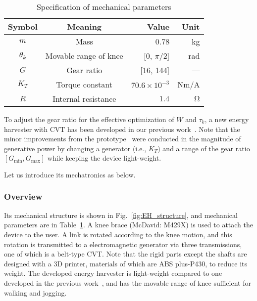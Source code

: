 \documentclass[twocolumn]{svjour3}          %
\begin{document}
\begin{table}[tb]
    \centering
    \small
    \caption{Specification of mechanical parameters}
    \begin{tabular}{ c c r r }
        \hline
        Symbol& Meaning & Value &  Unit
        \\ \hline
        $m$ & Mass & 0.78 & kg
        \\
        $\theta_k$ & Movable range of knee & [0, $\pi/2$] & rad
        \\
        $G$ & Gear ratio & [16, 144] & ---
        \\
        $K_T$ & Torque constant & $70.6 \times 10^{-3}$ & Nm/A
        \\
        $R$ & Internal resistance & $1.4$ & $\mathrm{\Omega}$
        \\ \hline
    \end{tabular}
    \label{tab:params_mech}
\end{table}

To adjust the gear ratio for the effective optimization of $W$ and $\tau_k$, a new energy harvester with CVT has been developed in our previous work~\cite{ikawa2018biomechanical}.
Note that the minor improvements from the prototype~\cite{ikawa2018biomechanical} were conducted in the magnitude of generative power by changing a generator (i.e., $K_T$) and a range of the gear ratio $[G_\mathrm{min}, G_\mathrm{max}]$ while keeping the device light-weight.

Let us introduce its mechatronics as below.

\subsubsection{Overview}

Its mechanical structure is shown in Fig.~\ref{fig:EH_structure}, and mechanical parameters are in Table~\ref{tab:params_mech}.
A knee brace (McDavid: M429X) is used to attach the device to the user.
A link is rotated according to the knee motion, and this rotation is transmitted to a electromagnetic generator via three transmissions, one of which is a belt-type CVT.
Note that the rigid parts except the shafts are designed with a 3D printer, materials of which are ABS plus-P430, to reduce its weight.
The developed energy harvester is light-weight compared to one developed in the previous work~\cite{donelan2008biomechanical}, and has the movable range of knee sufficient for walking and jogging.
\end{document}

